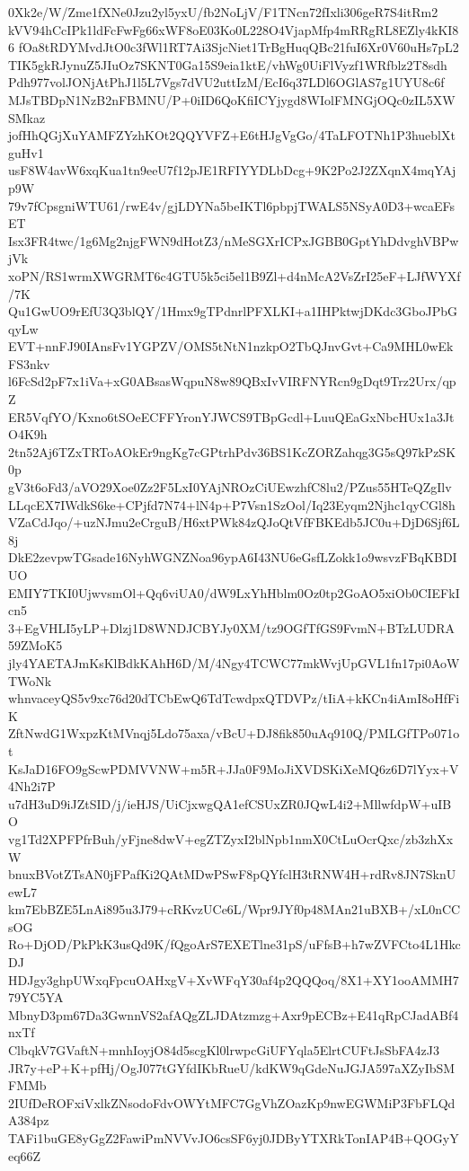 0Xk2e/W/Zme1fXNe0Jzu2yl5yxU/fb2NoLjV/F1TNcn72fIxli306geR7S4itRm2
kVV94hCcIPk1ldFcFwFg66xWF8oE03Ko0L228O4VjapMfp4mRRgRL8EZly4kKI86
fOa8tRDYMvdJtO0c3fWl1RT7Ai3SjcNiet1TrBgHuqQBc21fuI6Xr0V60uHs7pL2
TIK5gkRJynuZ5JIuOz7SKNT0Ga15S9eia1ktE/vhWg0UiFlVyzf1WRfblz2T8sdh
Pdh977volJONjAtPhJ1l5L7Vgs7dVU2uttIzM/EcI6q37LDl6OGlAS7g1UYU8c6f
MJsTBDpN1NzB2nFBMNU/P+0iID6QoKfiICYjygd8WIolFMNGjOQc0zIL5XWSMkaz
jofHhQGjXuYAMFZYzhKOt2QQYVFZ+E6tHJgVgGo/4TaLFOTNh1P3hueblXtguHv1
usF8W4avW6xqKua1tn9eeU7f12pJE1RFIYYDLbDcg+9K2Po2J2ZXqnX4mqYAjp9W
79v7fCpsgniWTU61/rwE4v/gjLDYNa5beIKTl6pbpjTWALS5NSyA0D3+wcaEFsET
Isx3FR4twc/1g6Mg2njgFWN9dHotZ3/nMeSGXrICPxJGBB0GptYhDdvghVBPwjVk
xoPN/RS1wrmXWGRMT6c4GTU5k5ci5el1B9Zl+d4nMcA2VsZrI25eF+LJfWYXf/7K
Qu1GwUO9rEfU3Q3blQY/1Hmx9gTPdnrlPFXLKI+a1IHPktwjDKdc3GboJPbGqyLw
EVT+nnFJ90IAnsFv1YGPZV/OMS5tNtN1nzkpO2TbQJnvGvt+Ca9MHL0wEkFS3nkv
l6FcSd2pF7x1iVa+xG0ABsasWqpuN8w89QBxIvVIRFNYRcn9gDqt9Trz2Urx/qpZ
ER5VqfYO/Kxno6tSOeECFFYronYJWCS9TBpGcdl+LuuQEaGxNbcHUx1a3JtO4K9h
2tn52Aj6TZxTRToAOkEr9ngKg7cGPtrhPdv36BS1KcZORZahqg3G5sQ97kPzSK0p
gV3t6oFd3/aVO29Xoe0Zz2F5LxI0YAjNROzCiUEwzhfC8lu2/PZus55HTeQZgIlv
LLqcEX7IWdkS6ke+CPjfd7N74+lN4p+P7Vsn1SzOol/Iq23Eyqm2Njhc1qyCGl8h
VZaCdJqo/+uzNJmu2eCrguB/H6xtPWk84zQJoQtVfFBKEdb5JC0u+DjD6Sjf6L8j
DkE2zevpwTGsade16NyhWGNZNoa96ypA6I43NU6eGsfLZokk1o9wsvzFBqKBDIUO
EMIY7TKI0UjwvsmOl+Qq6viUA0/dW9LxYhHblm0Oz0tp2GoAO5xiOb0CIEFkIcn5
3+EgVHLI5yLP+Dlzj1D8WNDJCBYJy0XM/tz9OGfTfGS9FvmN+BTzLUDRA59ZMoK5
jly4YAETAJmKsKlBdkKAhH6D/M/4Ngy4TCWC77mkWvjUpGVL1fn17pi0AoWTWoNk
whnvaceyQS5v9xc76d20dTCbEwQ6TdTcwdpxQTDVPz/tIiA+kKCn4iAmI8oHfFiK
ZftNwdG1WxpzKtMVnqj5Ldo75axa/vBcU+DJ8fik850uAq910Q/PMLGfTPo071ot
KsJaD16FO9gScwPDMVVNW+m5R+JJa0F9MoJiXVDSKiXeMQ6z6D7lYyx+V4Nh2i7P
u7dH3uD9iJZtSID/j/ieHJS/UiCjxwgQA1efCSUxZR0JQwL4i2+MllwfdpW+uIBO
vg1Td2XPFPfrBuh/yFjne8dwV+egZTZyxI2blNpb1nmX0CtLuOcrQxc/zb3zhXxW
bnuxBVotZTsAN0jFPafKi2QAtMDwPSwF8pQYfclH3tRNW4H+rdRv8JN7SknUewL7
km7EbBZE5LnAi895u3J79+cRKvzUCe6L/Wpr9JYf0p48MAn21uBXB+/xL0nCCsOG
Ro+DjOD/PkPkK3usQd9K/fQgoArS7EXETlne31pS/uFfsB+h7wZVFCto4L1HkcDJ
HDJgy3ghpUWxqFpcuOAHxgV+XvWFqY30af4p2QQQoq/8X1+XY1ooAMMH779YC5YA
MbnyD3pm67Da3GwnnVS2afAQgZLJDAtzmzg+Axr9pECBz+E41qRpCJadABf4nxTf
ClbqkV7GVaftN+mnhIoyjO84d5scgKl0lrwpcGiUFYqla5ElrtCUFtJsSbFA4zJ3
JR7y+eP+K+pfHj/OgJ077tGYfdIKbRueU/kdKW9qGdeNuJGJA597aXZyIbSMFMMb
2IUfDeROFxiVxlkZNsodoFdvOWYtMFC7GgVhZOazKp9nwEGWMiP3FbFLQdA384pz
TAFi1buGE8yGgZ2FawiPmNVVvJO6csSF6yj0JDByYTXRkTonIAP4B+QOGyYeq66Z

